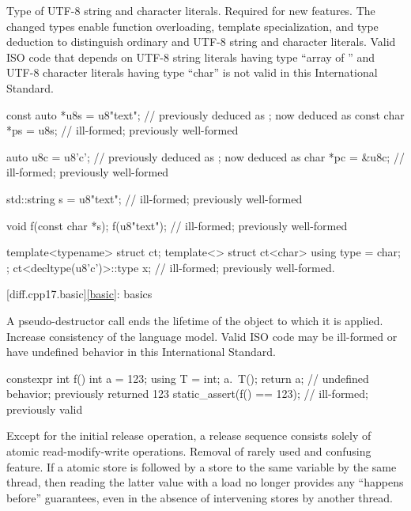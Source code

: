 \change
Type of UTF-8 string and character literals.
\rationale
Required for new features.
The changed types enable function overloading, template specialization, and
type deduction to distinguish ordinary and UTF-8 string and character literals.
\effect
Valid ISO \CppXVII{} code that depends on
UTF-8 string literals having type ``array of '' and
UTF-8 character literals having type ``char''
is not valid in this International Standard.
\begin{codeblock}
const auto *u8s = u8"text";     //  previously deduced as ; now deduced as 
const char *ps = u8s;           // ill-formed; previously well-formed

auto u8c = u8'c';               //  previously deduced as ; now deduced as 
char *pc = &u8c;                // ill-formed; previously well-formed

std::string s = u8"text";       // ill-formed; previously well-formed

void f(const char *s);
f(u8"text");                    // ill-formed; previously well-formed

template<typename> struct ct;
template<> struct ct<char> {
  using type = char;
};
ct<decltype(u8'c')>::type x;    // ill-formed; previously well-formed.
\end{codeblock}

[diff.cpp17.basic]{\ref{basic}: basics}

\change
A pseudo-destructor call ends the lifetime of
the object to which it is applied.
\rationale
Increase consistency of the language model.
\effect
Valid ISO \CppXVII{} code may be ill-formed or
have undefined behavior in this International Standard.
\begin{example}
\begin{codeblock}
constexpr int f() {
  int a = 123;
  using T = int;
  a.~T();
  return a;         // undefined behavior; previously returned 123
}
static_assert(f() == 123);  // ill-formed; previously valid
\end{codeblock}
\end{example}

\change
Except for the initial release operation,
a release sequence consists solely of atomic read-modify-write operations.
\rationale
Removal of rarely used and confusing feature.
\effect
If a  atomic store is followed
by a  store to the same variable by the same thread,
then reading the latter value with a  load
no longer provides any ``happens before'' guarantees,
even in the absence of intervening stores by another thread.

